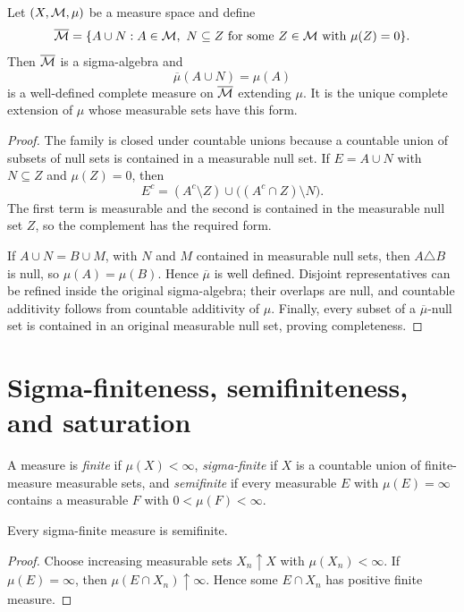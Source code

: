 \begin{thm}[Completion]
Let $(X,\mathcal{M},\mu)$ be a measure space and define
\[
\overline{\mathcal{M}}
 =\{A\cup N:A\in\mathcal{M},\ N\subseteq Z
      \text{ for some }Z\in\mathcal{M}\text{ with }\mu(Z)=0\}.
\]
Then $\overline{\mathcal{M}}$ is a sigma-algebra and
\[
\overline\mu(A\cup N)=\mu(A)
\]
is a well-defined complete measure on $\overline{\mathcal{M}}$ extending $\mu$. It is the unique complete extension of $\mu$ whose measurable sets have this form.
\end{thm}

\begin{proof}
The family is closed under countable unions because a countable union of subsets of null sets is contained in a measurable null set. If $E=A\cup N$ with $N\subseteq Z$ and $\mu(Z)=0$, then
\[
E^c=(A^c\setminus Z)\cup\bigl((A^c\cap Z)\setminus N\bigr).
\]
The first term is measurable and the second is contained in the measurable null set $Z$, so the complement has the required form.

If $A\cup N=B\cup M$, with $N$ and $M$ contained in measurable null sets, then $A\triangle B$ is null, so $\mu(A)=\mu(B)$. Hence $\overline\mu$ is well defined. Disjoint representatives can be refined inside the original sigma-algebra; their overlaps are null, and countable additivity follows from countable additivity of $\mu$. Finally, every subset of a $\overline\mu$-null set is contained in an original measurable null set, proving completeness.
\end{proof}

\section{Sigma-finiteness, semifiniteness, and saturation}

\begin{de}
A measure is \emph{finite} if $\mu(X)<\infty$, \emph{sigma-finite} if $X$ is a countable union of finite-measure measurable sets, and \emph{semifinite} if every measurable $E$ with $\mu(E)=\infty$ contains a measurable $F$ with $0<\mu(F)<\infty$.
\end{de}

\begin{prop}
Every sigma-finite measure is semifinite.
\end{prop}

\begin{proof}
Choose increasing measurable sets $X_n\uparrow X$ with $\mu(X_n)<\infty$. If $\mu(E)=\infty$, then $\mu(E\cap X_n)\uparrow\infty$. Hence some $E\cap X_n$ has positive finite measure.
\end{proof}

